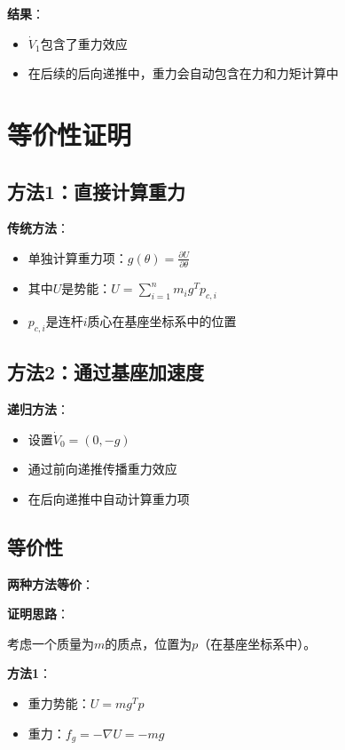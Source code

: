 \documentclass[12pt,a4paper]{article}
\begin{document}
\textbf{结果}：
\begin{itemize}
\item $\dot{V}_1$包含了重力效应
\item 在后续的后向递推中，重力会自动包含在力和力矩计算中
\end{itemize}

\section{等价性证明}

\subsection{方法1：直接计算重力}

\textbf{传统方法}：
\begin{itemize}
\item 单独计算重力项：$g(\theta) = \frac{\partial U}{\partial \theta}$
\item 其中$U$是势能：$U = \sum_{i=1}^n m_i g^T p_{c,i}$
\item $p_{c,i}$是连杆$i$质心在基座坐标系中的位置
\end{itemize}

\subsection{方法2：通过基座加速度}

\textbf{递归方法}：
\begin{itemize}
\item 设置$\dot{V}_0 = (0, -g)$
\item 通过前向递推传播重力效应
\item 在后向递推中自动计算重力项
\end{itemize}

\subsection{等价性}

\textbf{两种方法等价}：

\textbf{证明思路}：

考虑一个质量为$m$的质点，位置为$p$（在基座坐标系中）。

\textbf{方法1}：
\begin{itemize}
\item 重力势能：$U = mg^T p$
\item 重力：$f_g = -\nabla U = -mg$
\end{itemize}
\end{document}
